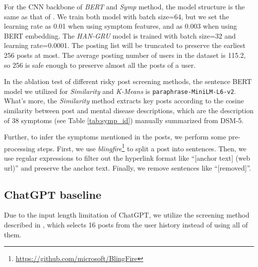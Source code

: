 For the CNN backbone of \textit{BERT} and \textit{Symp} method, the model structure is the same as that of \citet{nguyen2022improving}. We train both model with batch size=64, but we set the learning rate as 0.01 when using symptom features, and as 0.003 when using BERT embedding. The \textit{HAN-GRU} model is trained with batch size=32 and learning rate=0.0001. The posting list will be truncated to preserve the earliest 256 posts at most. The average posting number of users in the dataset is 115.2, so 256 is safe enough to preserve almost all the posts of a user. 

In the ablation test of different risky post screening methods, the sentence BERT model we utilized for \textit{Similarity} and \textit{K-Means} is \texttt{paraphrase-MiniLM-L6-v2}. What's more, the \textit{Similarity} \cite{zhang2022psychiatric} method extracts key posts according to the cosine similarity between post and mental disease descriptions, which are the description of 38 symptoms (see Table \ref{tab:symp_id}) manually summarized from DSM-5. 

Further, to infer the symptoms mentioned in the posts, we perform some pre-processing steps. First, we use \textit{blingfire}\footnote{\url{https://github.com/microsoft/BlingFire}} to split a post into sentences. Then, we use regular expressions to filter out the hyperlink format like ``[anchor text] (web url)'' and preserve the anchor text. Finally, we remove sentences like ``[removed]''. 
\subsection{ChatGPT baseline}
Due to the input length limitation of ChatGPT, we utilize the screening method described in , which selects 16 posts from the user history instead of using all of them.

